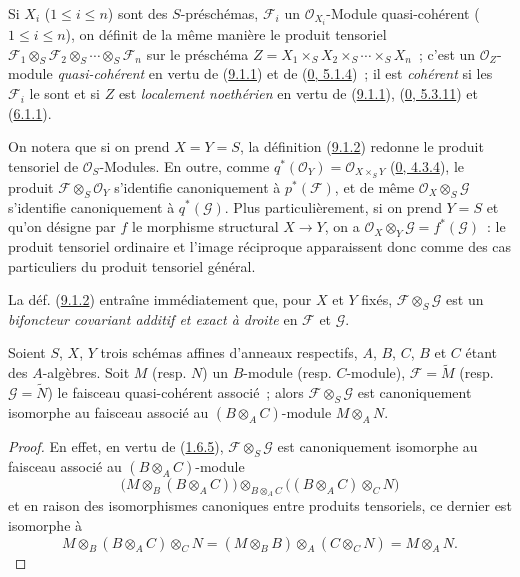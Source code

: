 Si $X_i$ ($1\leq i\leq n$) sont des $S$-préschémas, $\mathscr{F}_i$ un
$\mathscr{O}_{X_i}$-Module quasi-cohérent ($1\leq i\leq n$), on définit de
la même manière le produit tensoriel
$\mathscr{F}_1\otimes_S\mathscr{F}_2\otimes_S\cdots\otimes_S\mathscr{F}_n$
sur le préschéma
$Z=X_1\times_S X_2\times_S\cdots\times_S X_n$~; c'est un
$\mathscr{O}_Z$-module \emph{quasi-cohérent} en vertu de
(\hyperref[I.9.1.1-fr]{9.1.1}) et de
(\hyperref[0.5.1.4-fr]{0, 5.1.4})~; il est \emph{cohérent} si les
$\mathscr{F}_i$ le sont et si $Z$ est \emph{localement noethérien} en vertu
de (\hyperref[I.9.1.1-fr]{9.1.1}),
(\hyperref[0.5.3.11-fr]{0, 5.3.11}) et
(\hyperref[I.6.1.1-fr]{6.1.1}).

On notera que si on prend $X=Y=S$, la définition
(\hyperref[I.9.1.2-fr]{9.1.2}) redonne le produit tensoriel de
$\mathscr{O}_S$-Modules. En outre, comme
$q^*(\mathscr{O}_Y)=\mathscr{O}_{X\times_S Y}$
(\hyperref[0.4.3.4-fr]{0, 4.3.4}), le produit
$\mathscr{F}\otimes_S\mathscr{O}_Y$ s'identifie canoniquement à
$p^*(\mathscr{F})$, et de même
$\mathscr{O}_X\otimes_S\mathscr{G}$ s'identifie canoniquement à
$q^*(\mathscr{G})$. Plus particulièrement, si on prend $Y=S$ et qu'on
désigne par $f$ le morphisme structural $X\to Y$, on a
$\mathscr{O}_X\otimes_Y\mathscr{G}=f^*(\mathscr{G})$~: le produit tensoriel
ordinaire et l'image réciproque apparaissent donc comme des cas particuliers
du produit tensoriel général.

La déf. (\hyperref[I.9.1.2-fr]{9.1.2}) entraîne immédiatement que, pour $X$
et $Y$ fixés, $\mathscr{F}\otimes_S\mathscr{G}$ est un
\emph{bifoncteur covariant additif et exact à droite} en $\mathscr{F}$ et
$\mathscr{G}$.

\begin{proposition}[9.1.3]
\label{I.9.1.3-fr}
Soient $S$, $X$, $Y$ trois schémas affines d'anneaux respectifs, $A$, $B$,
$C$, $B$ et $C$ étant des $A$-algèbres. Soit $M$ (resp. $N$) un $B$-module
(resp. $C$-module), $\mathscr{F}=\widetilde{M}$ (resp.
$\mathscr{G}=\widetilde{N}$) le faisceau quasi-cohérent associé~; alors
$\mathscr{F}\otimes_S\mathscr{G}$ est canoniquement isomorphe au faisceau
associé au $(B\otimes_A C)$-module $M\otimes_A N$.
\end{proposition}

\begin{proof}
En effet, en vertu de (\hyperref[I.1.6.5-fr]{1.6.5}),
$\mathscr{F}\otimes_S\mathscr{G}$ est canoniquement isomorphe au faisceau
associé au $(B\otimes_A C)$-module
\[
  \bigl(M\otimes_B(B\otimes_A C)\bigr)
  \otimes_{B\otimes_A C}
  \bigl((B\otimes_A C)\otimes_C N\bigr)
\]
et en raison des isomorphismes canoniques entre produits tensoriels, ce
dernier est isomorphe à
\[
  M\otimes_B(B\otimes_A C)\otimes_C N
  =(M\otimes_B B)\otimes_A(C\otimes_C N)=M\otimes_A N.
\]
\end{proof}

